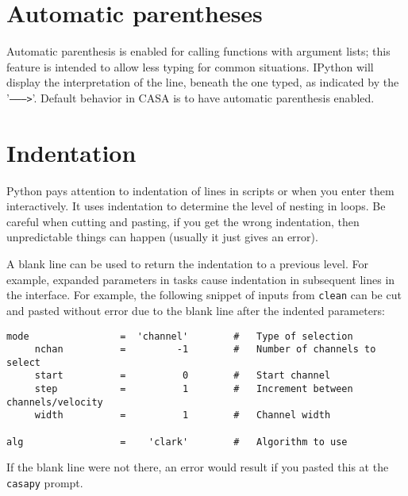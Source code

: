 \section{Automatic parentheses}
\label{section:python.par}

Automatic parenthesis is enabled for calling functions with argument
lists; this feature is intended to allow less typing for common
situations. IPython will display the interpretation of the line,
beneath the one typed, as indicated by the '{\tt -------->}'. Default
behavior in CASA is to have automatic parenthesis enabled. 

\section{Indentation}
\label{section:python.indent}

Python pays attention to indentation of lines in scripts or when you
enter them interactively.  It uses indentation to determine the level
of nesting in loops.  Be careful when cutting and pasting, if you
get the wrong indentation, then unpredictable things can happen
(usually it just gives an error).  

A blank line can be used to return the indentation to a previous
level.  For example, expanded parameters in tasks cause indentation
in subsequent lines in the interface.  For example, the following
snippet of inputs from {\tt clean} can be cut and pasted without 
error due to the blank line after the indented parameters:
\small
\begin{verbatim}
mode                =  'channel'        #   Type of selection
     nchan          =         -1        #   Number of channels to select 
     start          =          0        #   Start channel
     step           =          1        #   Increment between channels/velocity
     width          =          1        #   Channel width

alg                 =    'clark'        #   Algorithm to use
\end{verbatim}
\normalsize
If the blank line were not there, an error would result if you pasted
this at the {\tt casapy} prompt.

